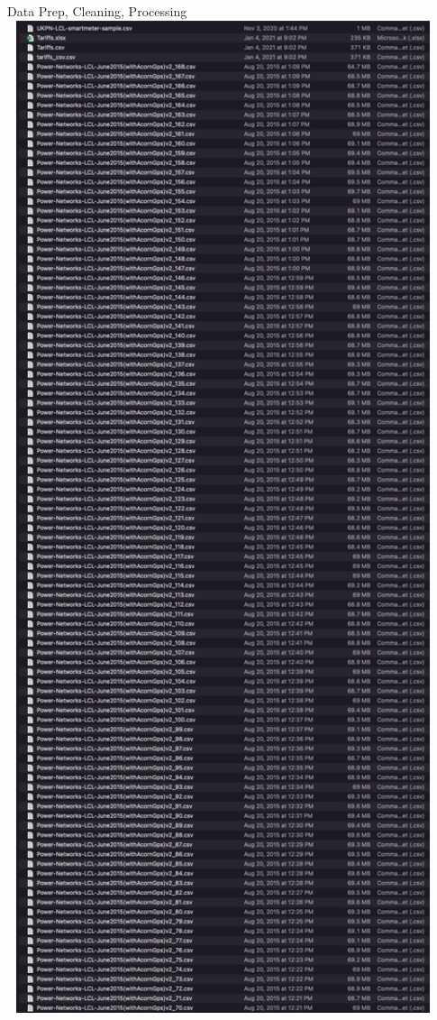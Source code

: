\documentclass{beamer}
\begin{document}
\begin{frame}{Data Prep, Cleaning, Processing}
  \includegraphics[width=0.95\textwidth]{images/lcl-raw-files.png}
\end{frame}
\end{document}
